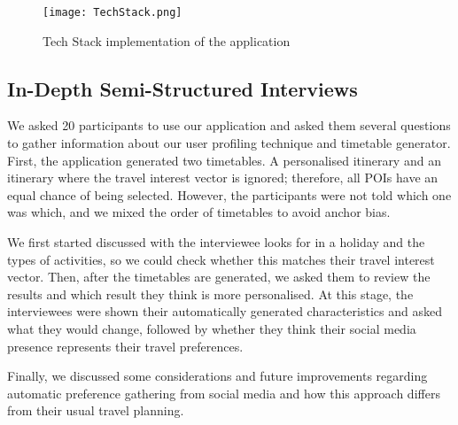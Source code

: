\begin{figure}[h]
\centering
\texttt{[image: TechStack.png]}
\caption{Tech Stack implementation of the application} \label{TechStack}
\end{figure}
\subsection{In-Depth Semi-Structured Interviews}

We asked 20 participants to use our application and
asked them several questions to gather information
about our user profiling technique and timetable
generator. First, the application generated two
timetables. A personalised itinerary and an itinerary
where the travel interest vector is ignored;
therefore, all POIs have an equal chance of being
selected. However, the participants were not told
which one was which, and we mixed the order of
timetables to avoid anchor bias. 

We first started discussed with the interviewee looks
for in a holiday and the types of activities, so we
could check whether this matches their travel interest
vector. Then, after the timetables are generated, we
asked them to review the results and which result they
think is more personalised.  At this stage, the
interviewees were shown their automatically generated
characteristics and asked what they would change,
followed by whether they think their social media
presence represents their travel preferences.

Finally, we discussed some considerations and future
improvements regarding automatic preference gathering
from social media and how this approach differs from
their usual travel planning.
